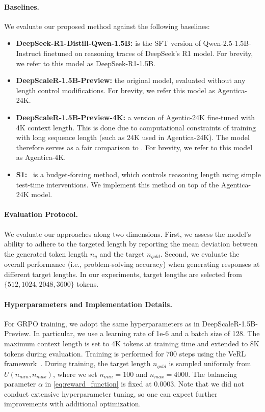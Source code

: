 \paragraph{Baselines.}
We evaluate our proposed method against the following baselines:
\begin{itemize}
  \item \textbf{DeepSeek-R1-Distill-Qwen-1.5B:} is the SFT version of Qwen-2.5-1.5B-Instruct finetuned on reasoning traces of DeepSeek's R1 model. For brevity, we refer to this model as DeepSeek-R1-1.5B.
  \item \textbf{DeepScaleR-1.5B-Preview:} the original model, evaluated without any length control modifications. For brevity, we refer this model as Agentica-24K.
  \item \textbf{DeepScaleR-1.5B-Preview-4K:} a version of Agentic-24K fine-tuned with 4K context length. This is done due to computational constraints of training \ours{} with long sequence length (such as 24K used in Agentica-24K). The model therefore serves as a fair comparison to \model{}. For brevity, we refer to this model as Agentica-4K.
  \item \textbf{S1:}~\citep{muennighoff2025s1simpletesttimescaling} is a budget-forcing method, which controls reasoning length using simple test-time interventions. We implement this method on top of the Agentica-24K model.
\end{itemize} 

\paragraph{Evaluation Protocol.}
We evaluate our approaches along two dimensions. First, we assess the model's ability to adhere to the targeted length by reporting the mean deviation between the generated token length $n_y$ and the target $n_{gold}$. Second, we evaluate the overall performance (i.e., problem-solving accuracy) when generating responses at different target lengths. In our experiments, target lengths are selected from $\{512, 1024, 2048, 3600\}$ tokens. 

\paragraph{Hyperparameters and Implementation Details.} 
For GRPO training, we adopt the same hyperparameters as in DeepScaleR-1.5B-Preview. In particular, we use a learning rate of 1e-6 and a batch size of 128. The maximum context length is set to 4K tokens at training time and extended to 8K tokens during evaluation. Training is performed for 700 steps using the VeRL framework~\citep{verl2025}.
During training, the target length $n_{gold}$ is sampled uniformly from $U(n_{min}, n_{max})$, where we set $n_{min}=100$ and $n_{max}=4000$. The balancing parameter $\alpha$ in \autoref{eq:reward_function} is fixed at 0.0003. Note that we did not conduct extensive hyperparameter tuning, so one can expect further improvements with additional optimization.

